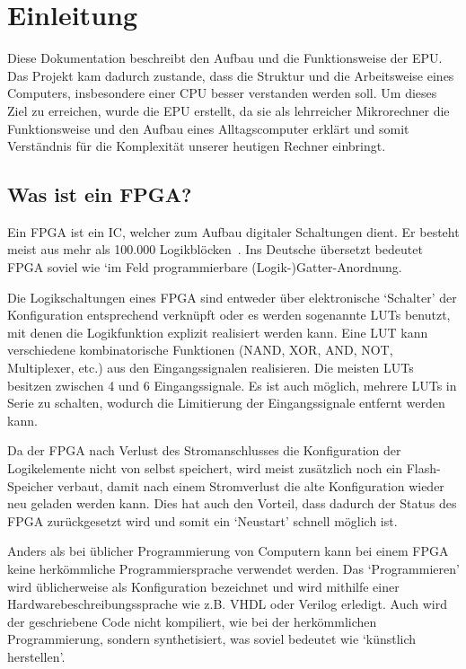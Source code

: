 \chapter{Einleitung}
\label{c:einleitung}
Diese Dokumentation beschreibt den Aufbau und die Funktionsweise der \ac{EPU}.
Das Projekt kam dadurch zustande, dass die Struktur und die Arbeitsweise eines
Computers, insbesondere einer \ac{CPU} besser verstanden werden soll. Um dieses
Ziel zu erreichen, wurde die \ac{EPU} erstellt, da sie als lehrreicher
Mikrorechner die Funktionsweise und den Aufbau eines Alltagscomputer erklärt und
somit Verständnis für die Komplexität unserer heutigen Rechner einbringt.

\section{Was ist ein FPGA?}
Ein \ac{FPGA} ist ein \ac{IC}, welcher zum Aufbau digitaler Schaltungen
dient. Er besteht meist aus mehr als 100.000 Logikblöcken~\cite[S. 8]{minicpu}.
Ins Deutsche übersetzt bedeutet \ac{FPGA} soviel wie `im Feld programmierbare
(Logik-)Gatter-Anordnung.

Die Logikschaltungen eines \ac{FPGA} sind entweder über elektronische `Schalter'
der Konfiguration entsprechend verknüpft oder es werden sogenannte \acp{LUT}
benutzt, mit denen die Logikfunktion explizit realisiert werden kann. Eine
\ac{LUT} kann verschiedene kombinatorische Funktionen (NAND, XOR, AND, NOT,
Multiplexer, etc.) aus den Eingangssignalen realisieren. Die meisten \acp{LUT}
besitzen zwischen 4 und 6 Eingangssignale. Es ist auch möglich, mehrere
\acp{LUT} in Serie zu schalten, wodurch die Limitierung der Eingangssignale
entfernt werden kann.~\cite{FPGA_Aufbau}

Da der \ac{FPGA} nach Verlust des Stromanschlusses die Konfiguration der
Logikelemente nicht von selbst speichert, wird meist zusätzlich noch ein
Flash-Speicher verbaut, damit nach einem Stromverlust die alte Konfiguration
wieder neu geladen werden kann. Dies hat auch den Vorteil, dass dadurch der
Status des \ac{FPGA} zurückgesetzt wird und somit ein `Neustart' schnell möglich
ist.

Anders als bei üblicher Programmierung von Computern kann bei einem \ac{FPGA}
keine herkömmliche Programmiersprache verwendet werden. Das `Programmieren' wird
üblicherweise als Konfiguration bezeichnet und wird mithilfe einer
Hardwarebeschreibungssprache wie z.B. VHDL oder Verilog erledigt. Auch wird der
geschriebene Code nicht kompiliert, wie bei der herkömmlichen Programmierung,
sondern synthetisiert, was soviel bedeutet wie `künstlich herstellen'.
